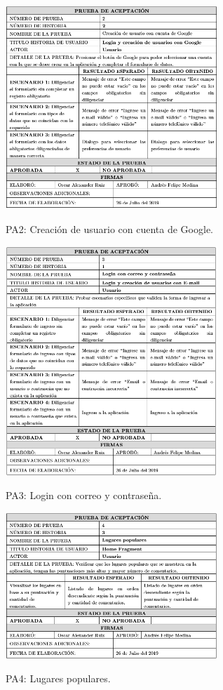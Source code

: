 \documentclass[12pt,letterpaper,openany]{book}
\begin{document}
\begin{table}[H]
\centering
\includegraphics[width=8cm]{./imagenes/PA/PA2}
\caption{PA2: Creación de usuario con cuenta de Google.}
\end{table}

\begin{table}[H]
\centering
\includegraphics[width=8cm]{./imagenes/PA/PA3}
\caption{PA3: Login con correo y contraseña.}
\end{table}

\begin{table}[H]
\centering
\includegraphics[width=8cm]{./imagenes/PA/PA4}
\caption{PA4: Lugares populares.}
\end{table}
\end{document}

